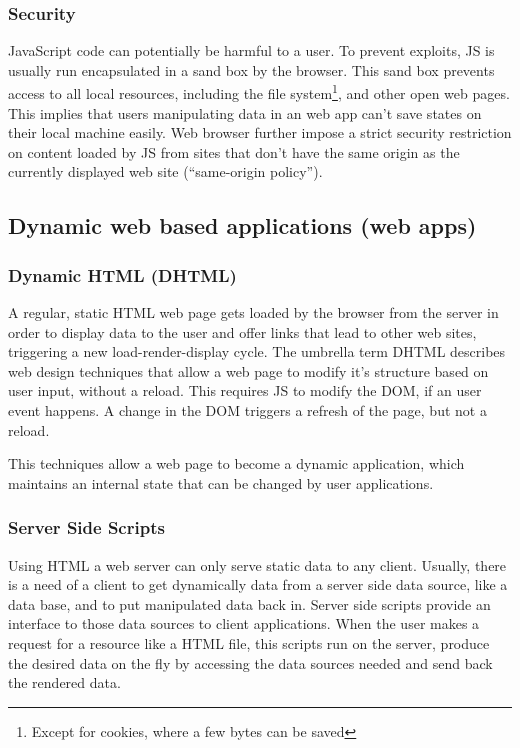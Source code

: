 
\subsubsection{Security}
JavaScript code can potentially be harmful to a user.
To prevent exploits, JS is usually run encapsulated in a sand box by the browser.
This sand box prevents access to all local resources, including the file system\footnote{Except for cookies, where a few bytes can be saved}, and other open web pages.
This implies that users manipulating data in an web app can't save states on their local machine easily.
Web browser further impose a strict security restriction on content loaded by JS from sites that don't have the same origin as the currently displayed web site (``same-origin policy'').


\subsection{Dynamic web based applications (web apps)}
\label{sec:webapps}
\subsubsection{Dynamic HTML (DHTML)}
\label{DHTML}

A regular, static HTML web page gets loaded by the browser from the server in order to display data to the user and offer links that lead to other web sites, triggering a new load-render-display cycle.
The umbrella term DHTML describes web design techniques that allow a web page to modify it's structure based on user input, without a reload.
This requires JS to modify the DOM, if an user event happens.
A change in the DOM triggers a refresh of the page, but not a reload.

This techniques allow a web page to become a dynamic application, which maintains an internal state that can be changed by user applications.


\subsubsection{Server Side Scripts}
\label{sec:serverside}

Using HTML a web server can only serve static data to any client.
Usually, there is a need of a client to get dynamically data from a server side data source, like a data base, and to put manipulated data back in.
Server side scripts provide an interface to those data sources to client applications.
When the user makes a request for a resource like a HTML file, this scripts run on the server, produce the desired data on the fly by accessing the data sources needed and send back the rendered data.

